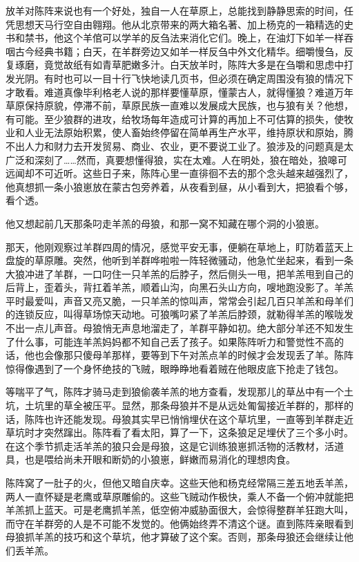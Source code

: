 \par 放羊对陈阵来说也有一个好处，独自一人在草原上，总能找到静静思索的时间，任凭思想天马行空自由翱翔。他从北京带来的两大箱名著、加上杨克的一箱精选的史书和禁书，他这个羊倌可以学羊的反刍法来消化它们。晚上，在油灯下如羊一样吞咽古今经典书籍；白天，在羊群旁边又如羊一样反刍中外文化精华。细嚼慢刍，反复琢磨，竟觉故纸有如青草肥嫩多汁。白天放羊时，陈阵大多是在刍嚼和思虑中打发光阴。有时也可以一目十行飞快地读几页书，但必须在确定周围没有狼的情况下才敢看。难道真像毕利格老人说的那样要懂草原，懂蒙古人，就得懂狼？难道万年草原保持原貌，停滞不前，草原民族一直难以发展成大民族，也与狼有关？他想，有可能。至少狼群的进攻，给牧场每年造成可计算的再加上不可估算的损失，使牧业和人业无法原始积累，使人畜始终停留在简单再生产水平，维持原状和原始，腾不出人力和财力去开发贸易、商业、农业，更不要说工业了。狼涉及的问题真是太广泛和深刻了……然而，真要想懂得狼，实在太难。人在明处，狼在暗处，狼嗥可远闻却不可近听。这些日子来，陈阵心里一直徘徊不去的那个念头越来越强烈了，他真想抓一条小狼崽放在蒙古包旁养着，从夜看到昼，从小看到大，把狼看个够，看个透。
\par 
\par 他又想起前几天那条叼走羊羔的母狼，和那一窝不知藏在哪个洞的小狼崽。
\par 那天，他刚观察过羊群四周的情况，感觉平安无事，便躺在草地上，盯防着蓝天上盘旋的草原雕。突然，他听到羊群哗啦啦一阵轻微骚动，他急忙坐起来，看到一条大狼冲进了羊群，一口叼住一只羊羔的后脖子，然后侧头一甩，把羊羔甩到自己的后背上，歪着头，背扛着羊羔，顺着山沟，向黑石头山方向，嗖地跑没影了。羊羔平时最爱叫，声音又亮又脆，一只羊羔的惊叫声，常常会引起几百只羊羔和母羊们的连锁反应，叫得草场惊天动地。可狼嘴叼紧了羊羔后脖颈，就勒得羊羔的喉咙发不出一点儿声音。母狼悄无声息地溜走了，羊群平静如初。绝大部分羊还不知发生了什么事，可能连羊羔妈妈都不知自己丢了孩子。如果陈阵听力和警觉性不高的话，他也会像那只傻母羊那样，要等到下午对羔点羊的时候才会发现丢了羊。陈阵惊得像遇到了一个身怀绝技的飞贼，眼睁睁地看着贼在他眼皮底下抢走了钱包。
\par 等喘平了气，陈阵才骑马走到狼偷袭羊羔的地方查看，发现那儿的草丛中有一个土坑，土坑里的草全被压平。显然，那条母狼并不是从远处匍匐接近羊群的，那样的话，陈阵也许还能发现。母狼其实早已悄悄埋伏在这个草坑里，一直等到羊群走近草坑时才突然蹿出。陈阵看了看太阳，算了一下，这条狼足足埋伏了三个多小时。在这个季节抓走活羊羔的狼只会是母狼，这是它训练狼崽抓活物的活教材，活道具，也是喂给尚未开眼和断奶的小狼崽，鲜嫩而易消化的理想肉食。
\par 陈阵窝了一肚子的火，但他又暗自庆幸。这些天他和杨克经常隔三差五地丢羊羔，两人一直怀疑是老鹰或草原雕偷的。这些飞贼动作极快，乘人不备一个俯冲就能把羊羔抓上蓝天。可是老鹰抓羊羔，低空俯冲威胁面很大，会惊得整群羊狂跑大叫，而守在羊群旁的人是不可能不发觉的。他俩始终弄不清这个谜。直到陈阵亲眼看到母狼抓羊羔的技巧和这个草坑，他才算破了这个案。否则，那条母狼还会继续让他们丢羊羔。
